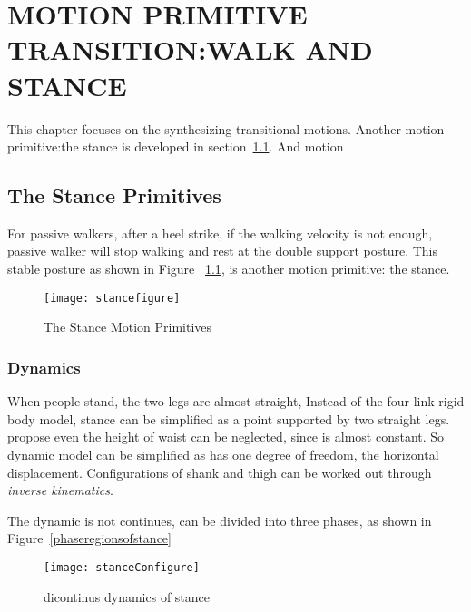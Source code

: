 
\chapter{MOTION PRIMITIVE TRANSITION:WALK AND STANCE}
\label{chap:stance}
    \graphicspath{{WalkStance/WalkStanceFigs/EPS/}{WalkStance/WalkStanceFigs/}}

This chapter focuses on the synthesizing transitional motions.
Another motion primitive:the stance is developed in section~\ref{sec:stanceprimitive}.
And motion




    
    




\section{The Stance Primitives}
\label{sec:stanceprimitive}
For passive walkers, after a  heel strike, if the walking velocity is not enough, passive walker will stop walking and rest at the double support posture.
This stable posture as shown in Figure ~\ref{fig:bipedalstance}, is another motion primitive: the stance. 

\begin{figure}[!htbp]
  \begin{center}
     \texttt{[image: stancefigure]}
    \caption{The Stance Motion Primitives}
    \label{fig:bipedalstance}
\end{center}
\end{figure}


\subsection{Dynamics}
When people stand, the two legs are almost straight, 
Instead of the four link rigid body model, stance can be simplified as a point supported by two straight legs. 
\citet{stephens2009modeling} propose even the height of waist can be neglected, since is almost constant.
So dynamic model can be simplified as has one degree of freedom, the horizontal displacement.
Configurations of shank and thigh can be worked out through \emph{inverse kinematics}.
 




The dynamic is not continues, can be divided into three phases, as shown in Figure~\ref{phaseregionsofstance}

\begin{figure}[!htbp]
  \begin{center}
     \texttt{[image: stanceConfigure]}
    \caption{dicontinus dynamics of stance}
    \label{fig:phaseregionsofstance}
\end{center}
\end{figure}


